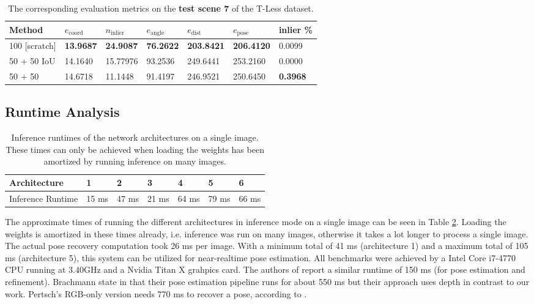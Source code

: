 \begin{table}[t]
\centering
\begin{tabular}{|l||llllll|} \hline
Method            & $e_{\text{coord}}$ & $n_{\text{inlier}}$ & $e_{\text{angle}}$ & $e_{\text{dist}}$ & $e_{\text{pose}}$ & inlier \% \\ \hline \hline \rowcolor{Gray}
100 {[}scratch{]} & \textbf{13.9687}            & \textbf{24.9087}                  & \textbf{76.2622}            & \textbf{203.8421}            & \textbf{206.4120}           & 0.0099    \\ \hline
50 + 50 IoU       & 14.1640            & 15.77976                   & 93.2536            & 249.6441          & 253.2160          & 0.0000       \\ \hline \rowcolor{Gray}
50 + 50           & 14.6718            & 11.1448                   & 91.4197            & 246.9521          & 250.6450          &   \textbf{0.3968}  \\ \hline
\end{tabular}
\caption{The corresponding evaluation metrics on the \textbf{test scene 7} of the T-Less dataset.}
\label{table:active_learning_test}
\end{table}

\subsection{Runtime Analysis}

\begin{table}[b]
\centering
\begin{tabular}{|l||llllll|}
\hline
Architecture      & 1     & 2     & 3     & 4     & 5     & 6     \\ \hline \hline \rowcolor{Gray}
Inference Runtime & 15 ms & 47 ms & 21 ms & 64 ms & 79 ms & 66 ms \\  \hline  
\end{tabular}
\caption{Inference runtimes of the network architectures on a single image. These times can only be achieved when loading the weights has been amortized by running inference on many images.}
\label{table:network_runtimes}
\end{table}

The approximate times of running the different architectures in inference mode on a single image can be seen in Table \ref{table:network_runtimes}. Loading the weights is amortized in these times already, i.e. inference was run on many images, otherwise it takes a lot longer to process a single image. The actual pose recovery computation took 26 ms per image. With a minimum total of 41 ms (architecture 1) and a maximum total of 105 ms (architecture 5), this system can be utilized for near-realtime pose estimation. All benchmarks were achieved by a Intel Core i7-4770 CPU running at 3.40GHz and a Nvidia Titan X grahpics card. The authors of \cite{bb8} report a similar runtime of 150 ms (for pose estimation and refinement). Brachmann \etal state in \cite{brachmann1} that their pose estimation pipeline runs for about 550 ms but their approach uses depth in contrast to our work. Pertsch's RGB-only version needs 770 ms to recover a pose, according to \cite{pertsch}.